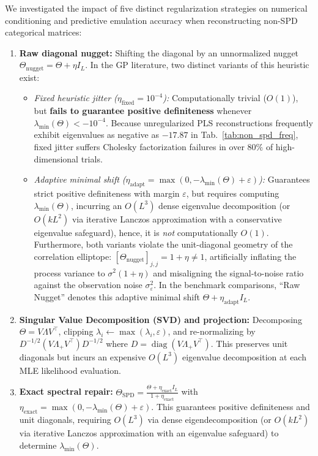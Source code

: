 \documentclass[default,sn-mathphys,Numbered]{sn-jnl}
\theoremstyle{thmstyleone}
\theoremstyle{thmstylethree}
\theoremstyle{thmstyletwo}
\newcommand{\diag}{\operatorname{diag}}
\begin{document}
We investigated the impact of five distinct regularization strategies on numerical conditioning and predictive emulation accuracy when reconstructing non-SPD categorical matrices:
\begin{enumerate}
    \item \textbf{Raw diagonal nugget:} Shifting the diagonal by an unnormalized nugget $\Theta_{\mathrm{nugget}} = \Theta + \eta I_L$. In the GP literature, two distinct variants of this heuristic exist:
    \begin{itemize}
        \item \textit{Fixed heuristic jitter ($\eta_{\mathrm{fixed}} = 10^{-4}$):} Computationally trivial ($O(1)$), but \textbf{fails to guarantee positive definiteness} whenever $\lambda_{\min}(\Theta) < -10^{-4}$. Because unregularized PLS reconstructions frequently exhibit eigenvalues as negative as $-17.87$ in Tab.~\ref{tab:non_spd_freq}, fixed jitter suffers Cholesky factorization failures in over $80\%$ of high-dimensional trials.
        \item \textit{Adaptive minimal shift ($\eta_{\mathrm{adapt}} = \max(0, -\lambda_{\min}(\Theta) + \varepsilon)$):} Guarantees strict positive definiteness with margin $\varepsilon$, but requires computing $\lambda_{\min}(\Theta)$, incurring an $O(L^3)$ dense eigenvalue decomposition (or $O(k L^2)$  via iterative Lanczos approximation with a conservative eigenvalue safeguard), hence, it is \textit{not} computationally $O(1)$. Furthermore, both variants violate the unit-diagonal geometry of the correlation elliptope: $[\Theta_{\mathrm{nugget}}]_{j, j} = 1 + \eta \neq 1$, artificially inflating the process variance to $\sigma^2(1+\eta)$ and misaligning the signal-to-noise ratio against the observation noise $\sigma_\varepsilon^2$. In the benchmark comparisons, ``Raw Nugget'' denotes this adaptive minimal shift $\Theta + \eta_{\mathrm{adapt}} I_L$.
    \end{itemize}
    \item \textbf{Singular Value Decomposition (SVD) and projection:} Decomposing $\Theta = V \Lambda V^\top$, clipping $\lambda_i \leftarrow \max(\lambda_i, \varepsilon)$, and re-normalizing by $D^{-1/2} (V \Lambda_+ V^\top) D^{-1/2}$ where $D = \diag(V \Lambda_+ V^\top)$. This preserves unit diagonals but incurs an expensive $O(L^3)$ eigenvalue decomposition at each MLE likelihood evaluation.
    \item \textbf{Exact spectral repair:} $\Theta_{\mathrm{SPD}} = \frac{\Theta + \eta_{\mathrm{exact}} I_L}{1 + \eta_{\mathrm{exact}}}$ with $\eta_{\mathrm{exact}} = \max(0, -\lambda_{\min}(\Theta) + \varepsilon)$. This guarantees positive definiteness and unit diagonals, requiring $O(L^3)$  via dense eigendecomposition (or $O(k L^2)$  via iterative Lanczos approximation with an eigenvalue safeguard) to determine $\lambda_{\min}(\Theta)$.

\end{enumerate}
\end{document}
